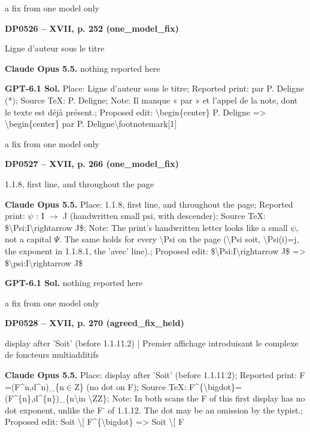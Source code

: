a fix from one model only\par
\par\noindent\hypertarget{DP0526}{}\textbf{DP0526 -- XVII, p. 252 (one\_model\_fix)}\par
Ligne d’auteur sous le titre\par
\textbf{Claude Opus 5.5.} nothing reported here\par
\textbf{GPT-6.1 Sol.} Place: Ligne d’auteur sous le titre; Reported print: par P. Deligne (*); Source TeX: P. Deligne; Note: Il manque « par » et l’appel de la note, dont le texte est déjà présent.; Proposed edit: \textbackslash{}begin\{center\} P. Deligne =\allowbreak > \textbackslash{}begin\{center\} par P. Deligne\textbackslash{}footnotemark[1]\par
a fix from one model only\par
\par\noindent\hypertarget{DP0527}{}\textbf{DP0527 -- XVII, p. 266 (one\_model\_fix)}\par
1.1.8, first line, and throughout the page\par
\textbf{Claude Opus 5.5.} Place: 1.1.8, first line, and throughout the page; Reported print: \ensuremath{\psi} : I \ensuremath{\longrightarrow} J (handwritten small psi, with descender); Source TeX: \$\textbackslash{}Psi:I\textbackslash{}rightarrow J\$; Note: The print's handwritten letter looks like a small \ensuremath{\psi}, not a capital \ensuremath{\Psi}. The same holds for every \textbackslash{}Psi on the page (\textbackslash{}Psi soit, \textbackslash{}Psi(i)=\allowbreak j, the exponent in 1.1.8.1, the 'avec' line).; Proposed edit: \$\textbackslash{}Psi:I\textbackslash{}rightarrow J\$ =\allowbreak > \$\textbackslash{}psi:I\textbackslash{}rightarrow J\$\par
\textbf{GPT-6.1 Sol.} nothing reported here\par
a fix from one model only\par
\par\noindent\hypertarget{DP0528}{}\textbf{DP0528 -- XVII, p. 270 (agreed\_fix\_held)}\par
display after 'Soit' (before 1.1.11.2) | Premier affichage introduisant le complexe de foncteurs multiadditifs\par
\textbf{Claude Opus 5.5.} Place: display after 'Soit' (before 1.1.11.2); Reported print: F =\allowbreak  (F\textasciicircum{}n,d\textasciicircum{}n)\_\{n\ensuremath{\in}Z\} (no dot on F); Source TeX: F\textasciicircum{}\{\textbackslash{}bigdot\}=\allowbreak (F\textasciicircum{}\{n\},d\textasciicircum{}\{n\})\_\{n\textbackslash{}in \textbackslash{}ZZ\}; Note: In both scans the F of this first display has no dot exponent, unlike the F˙ of 1.1.12. The dot may be an omission by the typist.; Proposed edit: Soit \textbackslash{}[ F\textasciicircum{}\{\textbackslash{}bigdot\} =\allowbreak > Soit \textbackslash{}[ F\par
